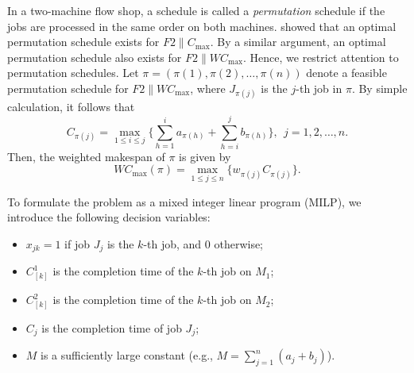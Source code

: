 ﻿\documentclass[12pt]{article}
\begin{document}
\begin{sloppypar}
In a two-machine flow shop, a schedule is called a \textit{permutation} schedule if the jobs are processed 
in the same order on both machines. \cite{johnson1954optimal} showed that an optimal permutation schedule exists 
for $F2 \parallel C_{\max}$. By a similar argument, an optimal permutation schedule also exists for
$F2 \parallel WC_{\max}$. Hence, we restrict  attention to permutation schedules. 
Let $\pi = (\pi(1), \pi(2), \ldots, \pi(n))$ denote a feasible permutation schedule for $F2 \parallel WC_{\max}$, 
where $J_{\pi(j)}$ is the $j$-th job in $\pi$. By simple calculation, it follows that 
\begin{equation}\label{eq:completion}
C_{\pi(j)} = \max_{1 \leq i \leq j} \Big\{\sum_{h=1}^{i}a_{\pi(h)} + \sum_{h=i}^{j}b_{\pi(h)} \Big\}, ~~ j=1, 2, \ldots, n.
\end{equation}
Then, the weighted makespan of $\pi$ is given by 
\begin{equation}\label{eq:wcmax}
W C_{\max}(\pi)=\max_{1 \leq j \leq n}\{ w_{\pi(j)} C_{\pi(j)}\}.
\end{equation}

To formulate the problem as a mixed integer linear program (MILP), we introduce the following decision variables:
\begin{itemize}
\item $x_{jk} = 1$ if job $J_j$ is the $k$-th job, and $0$ otherwise;
\item $C_{[k]}^1$ is the completion time of the $k$-th job on $M_1$;
\item $C_{[k]}^2$ is the completion time of the $k$-th job on $M_2$;
\item $C_j$ is the completion time of job $J_j$;
\item $M$ is a sufficiently large constant (e.g., $M=\sum_{j=1}^{n}(a_j + b_j)$).
\end{itemize}
        

\end{sloppypar}
\end{document}
